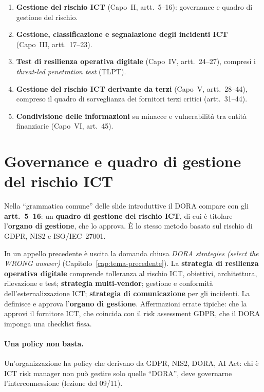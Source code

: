 \begin{integrazione}
\begin{enumerate}
  \item \textbf{Gestione del rischio ICT} (Capo~II, artt.~5--16): governance e quadro di gestione del
    rischio.
  \item \textbf{Gestione, classificazione e segnalazione degli incidenti ICT} (Capo~III,
    artt.~17--23).
  \item \textbf{Test di resilienza operativa digitale} (Capo~IV, artt.~24--27), compresi i
    \emph{threat-led penetration test} (TLPT).
  \item \textbf{Gestione del rischio ICT derivante da terzi} (Capo~V, artt.~28--44), compreso il
    quadro di sorveglianza dei fornitori terzi critici (artt.~31--44).
  \item \textbf{Condivisione delle informazioni} su minacce e vulnerabilità tra entità finanziarie
    (Capo~VI, art.~45).
\end{enumerate}
\end{integrazione}

\section{Governance e quadro di gestione del rischio ICT}
\label{sec:dora-rischio}

Nella ``grammatica comune'' delle slide introduttive il DORA compare con gli \textbf{artt.~5--16}: un
\textbf{quadro di gestione del rischio ICT}, di cui è titolare l'\textbf{organo di gestione}, che lo
approva. È lo stesso metodo basato sul rischio di GDPR, NIS2 e ISO/IEC~27001.

\begin{esame}
In un appello precedente è uscita la domanda chiusa \emph{DORA strategies (select the WRONG answer)}
(Capitolo~\ref{cap:tema-precedente}). La \textbf{strategia di resilienza operativa digitale} comprende
tolleranza al rischio ICT, obiettivi, architettura, rilevazione e test; \textbf{strategia multi-vendor};
gestione e conformità dell'esternalizzazione ICT; \textbf{strategia di comunicazione} per gli incidenti.
La definisce e approva l'\textbf{organo di gestione}. Affermazioni errate tipiche: che la approvi il
fornitore ICT, che coincida con il risk assessment GDPR, che il DORA imponga una checklist fissa.
\end{esame}

\paragraph{Una policy non basta.} Un'organizzazione ha policy che derivano da GDPR, NIS2, DORA, AI
Act: chi è ICT risk manager non può gestire solo quelle ``DORA'', deve governarne l'interconnessione
(lezione del 09/11).


